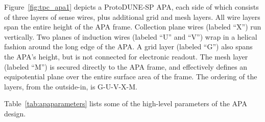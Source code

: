%
Figure~\ref{fig:tpc_apa1} depicts a ProtoDUNE-SP APA, each  side of which consists of three layers of sense wires, plus additional grid and mesh layers.  All wire layers span the entire height of the APA frame. Collection plane wires (labeled ``X'') run vertically.  Two planes of induction wires (labeled ``U'' and ``V'') wrap in a helical fashion around the long edge of the APA.  A grid layer (labeled ``G'') also spans the APA's height, but is not connected for electronic readout.  The mesh layer (labeled ``M'') is secured directly to the APA frame, and effectively defines an equipotential plane over the entire surface area of the frame.  The ordering of the layers, from the outside-in, is G-U-V-X-M. 

Table~\ref{tab:apaparameters} lists some of the high-level parameters of the APA design.

